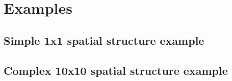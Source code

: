 
\section{Examples\label{sec:examples}}


\subsection{Simple 1x1 spatial structure example\label{example1}}


\subsection{Complex 10x10 spatial structure example\label{example2}}


